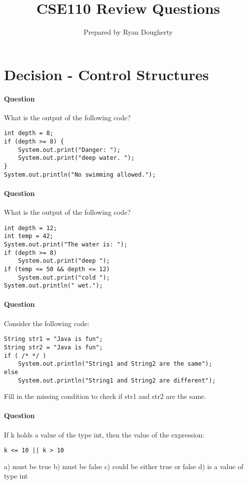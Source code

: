 \documentclass{article}
\title{CSE110 Review Questions}
\author{Prepared by Ryan Dougherty}
\date{}
\begin{document}
\maketitle

\section*{Decision - Control Structures}


\setcounter{question_num}{1}
\paragraph{Question }
What is the output of the following code?
\begin{lstlisting}
int depth = 8;
if (depth >= 8) {
	System.out.print("Danger: ");
	System.out.print("deep water. ");
}
System.out.println("No swimming allowed.");
\end{lstlisting}


\addtocounter{question_num}{1}
\paragraph{Question }
What is the output of the following code?
\begin{lstlisting}
int depth = 12;
int temp = 42;
System.out.print("The water is: ");
if (depth >= 8)
	System.out.print("deep ");
if (temp <= 50 && depth <= 12)
	System.out.print("cold ");
System.out.println(" wet.");
\end{lstlisting}

\addtocounter{question_num}{1}
\paragraph{Question }
Consider the following code:
\begin{lstlisting}
String str1 = "Java is fun";
String str2 = "Java is fun";
if ( /* */ )
	System.out.println("String1 and String2 are the same");
else
	System.out.println("String1 and String2 are different");
\end{lstlisting}
Fill in the missing condition to check if str1 and str2 are the same.

\addtocounter{question_num}{1}
\paragraph{Question }
If k holds a value of the type int, then the value of the expression:
\begin{lstlisting}
k <= 10 || k > 10
\end{lstlisting}
a) must be true
\newline b) must be false
\newline c) could be either true or false
\newline d) is a value of type int
\end{document}
